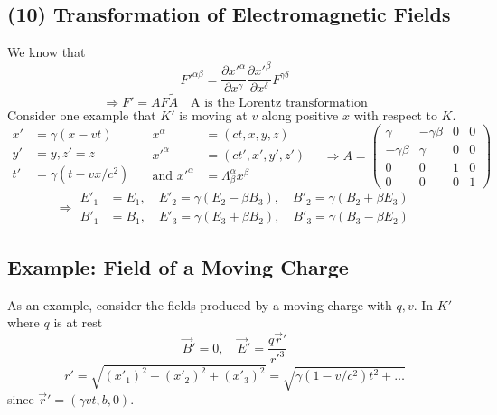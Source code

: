 \documentclass{article}
\begin{document}
	\subsection*{(10) Transformation of Electromagnetic Fields}
	We know that
	\[ F'^{\alpha\beta} = \frac{\partial x'^\alpha}{\partial x^\gamma} \frac{\partial x'^\beta}{\partial x^\delta} F^{\gamma\delta} \]
	\[ \Rightarrow F' = A F \tilde{A} \quad \text{A is the Lorentz transformation} \]
	Consider one example that $K'$ is moving at $v$ along positive $x$ with respect to $K$.
	\[
	\begin{aligned}
		x' &= \gamma(x-vt) \\
		y' &= y, z' = z \\
		t' &= \gamma(t - vx/c^2)
	\end{aligned}
	\quad
	\begin{aligned}
		x^\alpha &= (ct, x, y, z) \\
		x'^\alpha &= (ct', x', y', z') \\
		\text{and } x'^\alpha &= \Lambda^\alpha_\beta x^\beta
	\end{aligned}
	\quad \Rightarrow A =
	\begin{pmatrix}
		\gamma & -\gamma\beta & 0 & 0 \\
		-\gamma\beta & \gamma & 0 & 0 \\
		0 & 0 & 1 & 0 \\
		0 & 0 & 0 & 1
	\end{pmatrix}
	\]
	\[ \Rightarrow
	\begin{aligned}
		E'_1 &= E_1, \quad E'_2 = \gamma(E_2 - \beta B_3), \quad B'_2 = \gamma(B_2 + \beta E_3) \\
		B'_1 &= B_1, \quad E'_3 = \gamma(E_3 + \beta B_2), \quad B'_3 = \gamma(B_3 - \beta E_2)
	\end{aligned}
	\]
	
	\subsection*{Example: Field of a Moving Charge}
	As an example, consider the fields produced by a moving charge with $q, v$.
	In $K'$ where $q$ is at rest
	\[ \vec{B}'=0, \quad \vec{E}'=\frac{q\vec{r}'}{r'^3} \]
	\[ r' = \sqrt{(x'_1)^2+(x'_2)^2+(x'_3)^2} = \sqrt{\gamma(1-v/c^2)t^2 + \dots} \]
	since $\vec{r}' = (\gamma vt, b, 0)$.
	
\end{document}

